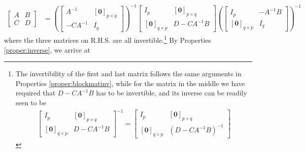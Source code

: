 \begin{align*}
\begin{bmatrix}
A & B \\
C & D
\end{bmatrix}
&= 
\left(\begin{bmatrix}
A^{-1} & [\textbf{0}]_{p\times q} \\
-CA^{-1} & I_q
\end{bmatrix}\right)^{-1}
\begin{bmatrix}
I_p & [\textbf{0}]_{p \times q} \\
[\textbf{0}]_{q\times p} & D - CA^{-1}B 
\end{bmatrix}
\left(\begin{bmatrix}
I_p & -A^{-1}B \\
[\textbf{0}]_{q \times p} & I_q
\end{bmatrix}\right)^{-1}
\end{align*}
where the three matrices on R.H.S. are all invertible.\footnote{The invertibility of the first and last matrix follows the same arguments in Properties \ref{proper:blockmatinv}, while for the matrix in the middle we have required that $D-CA^{-1}B$ has to be invertible, and its inverse can be readily seen to be
\begin{align*}
\begin{bmatrix}
I_p & [\textbf{0}]_{p \times q} \\
[\textbf{0}]_{q\times p} & D - CA^{-1}B 
\end{bmatrix}^{-1}
=
\begin{bmatrix}
I_p & [\textbf{0}]_{p \times q} \\
[\textbf{0}]_{q\times p} & (D - CA^{-1}B)^{-1}
\end{bmatrix}
\end{align*}} By Properties \ref{proper:inverse}, we arrive at
